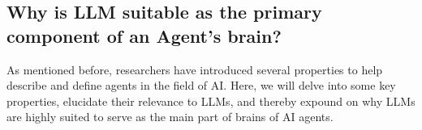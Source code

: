 \documentclass{article}
\begin{document}




\subsection{ Why is LLM suitable as the primary component of an Agent's brain?} \label{sec:Key Characteristics of Agent & Why LLMs Are Suitable Agent Brains?}



As mentioned before, researchers have introduced several properties to help describe and define agents in the field of AI. Here, we will delve into some key properties, elucidate their relevance to LLMs, and thereby expound on why LLMs are highly suited to serve as the main part of brains of AI agents.
\end{document}
